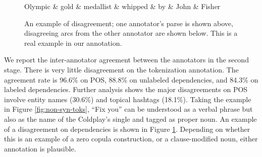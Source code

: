 \documentclass[11pt,a4paper]{article}
\begin{document}
\begin{figure}
\centering
\small
\begin{dependency}[edge slant=2, text only label, label style=above]
	\begin{deptext}
		Olympic \& gold \& medallist \& whipped \& by \& John \& Fisher \\
	\end{deptext}
\end{dependency}
\caption{An example of disagreement; one annotator's parse is shown above, disagreeing arcs from the other
  annotator are shown below. This is a real example in our annotation.}\label{fig:disagree}
\end{figure}

We report the inter-annotator agreement between the annotators
in the second stage. There is very little disagreement on the
tokenization annotation. %
The agreement rate is 96.6\% on POS, 
88.8\% on unlabeled dependencies, and
84.3\% on labeled dependencies. 
Further analysis shows the major disagreements on POS
involve entity names (30.6\%) %
and topical hashtags (18.1\%).
Taking the example in Figure \ref{fig:non-syn-toks}, ``Fix you'' 
can
be understood as a verbal phrase but also as the name of the Coldplay's
single and tagged as proper noun. 
An example of a disagreement on
dependencies is shown in Figure \ref{fig:disagree}.  Depending on
whether this is an example of a zero copula construction, or a clause-modified
noun, either annotation is plausible.
\end{document}
